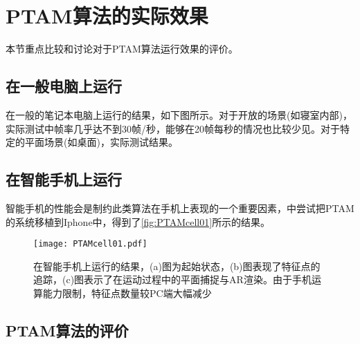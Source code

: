 \section{PTAM算法的实际效果}

本节重点比较和讨论对于PTAM算法运行效果的评价。

\subsection{在一般电脑上运行}

在一般的笔记本电脑上运行的结果，如下图所示。对于开放的场景(如寝室内部)，实际测试中帧率几乎达不到30帧/秒，能够在20帧每秒的情况也比较少见。对于特定的平面场景(如桌面)，实际测试结果。

\subsection{在智能手机上运行}

智能手机的性能会是制约此类算法在手机上表现的一个重要因素，\cite{Klein2009}中尝试把PTAM的系统移植到Iphone中，得到了\autoref{fig:PTAMcell01}所示的结果。

\begin{figure}[!htbp]
\centering
\texttt{[image: PTAMcell01.pdf]}
\caption{在智能手机上运行的结果，(a)图为起始状态，(b)图表现了特征点的追踪，(c)图表示了在运动过程中的平面捕捉与AR渲染。由于手机运算能力限制，特征点数量较PC端大幅减少}
\label{fig:PTAMcell01}
\end{figure}


\subsection{PTAM算法的评价}
